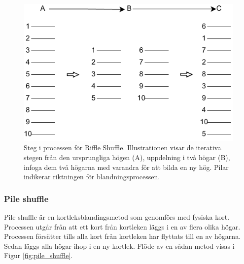 \documentclass[swedish,a4paper]{article}
\begin{document}
\begin{figure}[H]
	\begin{center}
		\includegraphics{images/rifflle-shuffle.pdf}
	\end{center}
	\captionsetup{justification=centering,margin=2cm}
	\caption{Steg i processen för Riffle Shuffle. Illustrationen visar de
	iterativa stegen från den ursprungliga högen (A), uppdelning i två
	högar (B), infoga dem två högarna med varandra för att bilda en ny hög.
        Pilar indikerar riktningen för blandningsprocessen.}
	\label{fig:riffle_shuffle_1}
\end{figure}


\subsubsection{Pile shuffle}
\label{sec:pile_shuffle}
Pile shuffle är en kortleksblandingsmetod som genomförs med fysiska
kort. Processen utgår från att ett kort
från kortleken läggs i en av flera olika högar. Processen försätter
tills alla kort från kortleken har flyttats till en av högarna. Sedan
läggs  alla högar ihop i en ny kortlek. Flöde av en sådan metod visas i Figur
\ref{fig:pile_shuffle}.
\end{document}
